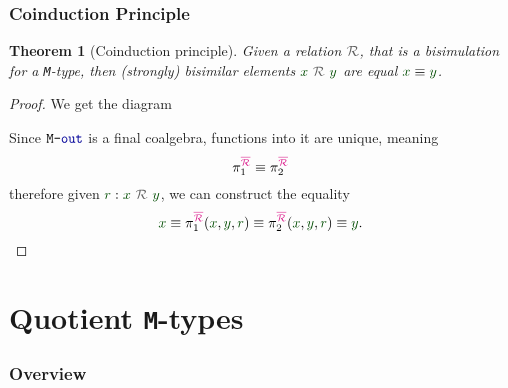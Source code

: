 \documentclass[xelatex,mathserif,serif,notheorems]{beamer} %
\theoremstyle{plain} %
\newtheorem{thm}{Theorem}[section]
\theoremstyle{definition}
\theoremstyle{remark}
\newcommand*{\term}[1]{\textcolor{green!30!black}{#1}} %
\newcommand*{\type}[1]{\textcolor{magenta!90!black}{#1}}
\newcommand*{\coalg}[2]{#1\texttt{-}#2}
\newcommand*{\relation}[1]{\textcolor{gray!75!black}{\ensuremath{\mathtt{#1}}}}
\newcommand*{\constant}[1]{\textcolor{orange!60!black}{\ensuremath{\mathtt{#1}}}}
\newcommand*{\function}[1]{\textcolor{blue!60!black}{\ensuremath{\mathtt{#1}}}}
\newcommand*{\typeformer}[1]{\ensuremath{\mathtt{#1}}}
\newcommand{\setlengths}{
  \setlength{\abovedisplayskip}{4pt}
  \setlength{\belowdisplayskip}{4pt}
  \setlength{\abovedisplayshortskip}{2pt}
  \setlength{\belowdisplayshortskip}{2pt}
}
\begin{document}
\begin{frame}[fragile]
  \frametitle{Coinduction Principle}
  \begin{thm}[Coinduction principle]\setlengths
    Given a relation \(\relation{\mathcal{R}}\), that is a bisimulation for a \texttt{M}-type, then (strongly) bisimilar elements \(\term{x}~\relation{\mathcal{R}}~\term{y}\) are equal \(\term{x} \equiv \term{y}\).
  \end{thm}
  \pause
  \begin{proof}\setlengths
    We get the diagram
    \begin{figure}[h]
      \centering
    \end{figure}
    Since \(\coalg{\typeformer{M}}{\function{out}}\) is a final coalgebra, functions into it are unique, meaning
    \begin{equation}
    \pi_1^{\type{\overline{\mathcal{R}}}} \equiv \pi_2^{\type{\overline{\mathcal{R}}}} %
  \end{equation}
    therefore given \(\term{r} : \term{x}~\relation{\mathcal{R}}~\term{y}\), we can construct the equality
    \begin{equation}
      \term{x} \equiv \pi_1^{\type{\overline{\mathcal{R}}}} (\term{x}, \term{y}, \term{r}) \equiv \pi_2^{\type{\overline{\mathcal{R}}}} (\term{x}, \term{y}, \term{r}) \equiv \term{y}.
    \end{equation}
  \end{proof}  
\end{frame}

\section{Quotient \texttt{M}-types}
\begin{frame}
  \frametitle{Overview}
  \tableofcontents[currentsection]
\end{frame}
\end{document}
